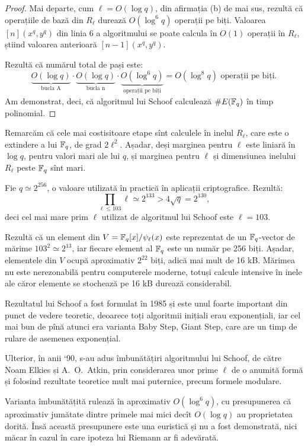 \begin{proof}
    Mai departe, cum $ \ell = O(\log q) $, din afirmația (b) de mai sus,
    rezultă că operațiile de bază din $ R_\ell $ durează $ O(\log^6 q) $
    operații pe biți. Valoarea $ [n](x^q, y^q) $ din linia 6 a algoritmului
    se poate calcula în $ O(1) $ operații în $ R_\ell $, știind valoarea
    anterioară $ [n-1](x^q, y^q) $.

    Rezultă că numărul total de pași este:
    \[
        \underbrace{O(\log q)}_{\text{bucla A}} \cdot \underbrace{O(\log q)}_{\text{bucla n}} \cdot %
        \underbrace{O(\log^6 q)}_{\text{operații pe biți}} = O(\log^8 q) \text{ operații pe biți}.
    \]
    Am demonstrat, deci, că algoritmul lui Schoof calculează $ \# E(\mathbb{F}_q) $ în timp polinomial.
\end{proof}

Remarcăm că cele mai costisitoare etape sînt calculele în inelul $ R_\ell $, care este o
extindere a lui $ \mathbb{F}_q $, de grad $ 2 \ell^2 $. Așadar, deși marginea pentru $ \ell $
este liniară în $ \log q $, pentru valori mari ale lui $ q $, și marginea pentru $ \ell $
și dimensiunea inelului $ R_\ell $ peste $ \mathbb{F}_q $ sînt mari.

\begin{example}\label{exm:schoof}
  Fie $ q \simeq 2^{256} $, o valoare utilizată în practică în aplicații
  criptografice. Rezultă:
  \[
    \prod_{\ell \leq 103} \ell \simeq 2^{133} > 4 \sqrt{q} = 2^{130},
  \]
  deci cel mai mare prim $ \ell $ utilizat de algoritmul lui Schoof este $ \ell = 103 $.

  Rezultă că un element din $ V = \mathbb{F}_q[x]/\psi_\ell(x) $ este reprezentat de un
  $ \mathbb{F}_q $-vector de mărime $ 103^2 \simeq 2^{13} $, iar fiecare element al
  $ \mathbb{F}_q $ este un număr pe 256 biți. Așadar, elementele din $ V $ ocupă
  aproximativ $ 2^{22} $ biți, adică mai mult de 16 kB. Mărimea nu este nerezonabilă
  pentru computerele moderne, totuși calcule intensive în inele ale căror elemente se
  stochează pe 16 kB durează considerabil.
\end{example}

Rezultatul lui Schoof a fost formulat în 1985 și este unul foarte important din punct
de vedere teoretic, deoarece toți algoritmii inițiali erau exponențiali, iar
cel mai bun de pînă atunci era varianta Baby Step, Giant Step, care are un timp
de rulare de asemenea exponențial.

Ulterior, în anii `90, s-au adus îmbunătățiri algoritmului lui Schoof, de
către Noam Elkies și A.\ O.\ Atkin, prin considerarea unor prime $ \ell $
de o anumită formă și folosind rezultate teoretice mult mai puternice,
precum formele modulare.

Varianta îmbunătățită rulează în aproximativ $ O(\log^6 q) $, cu presupunerea
că aproximativ jumătate dintre primele mai mici decît $ O(\log q) $ au
proprietatea dorită. Însă această presupunere este una euristică și nu
a fost demonstrată, nici măcar în cazul în care ipoteza lui Riemann ar fi
adevărată.



